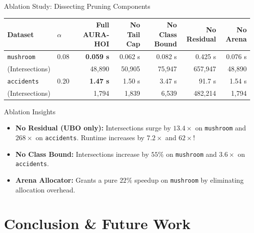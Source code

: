 \documentclass[aspectratio=169,10pt]{beamer}
\newcommand{\AURA}{\textsc{AURA-HOI}}
\begin{document}
\begin{frame}{Ablation Study: Dissecting Pruning Components}
  \begin{table}
    \small
    \begin{tabular}{llrrrrr}
      \toprule
      Dataset & $\alpha$ & Full \AURA{} & No Tail Cap & No Class Bound & No Residual & No Arena \\
      \midrule
      \texttt{mushroom} & 0.08 & \textbf{0.059 s} & 0.062 s & 0.082 s & 0.425 s & 0.076 s \\
      (Intersections) & & 48,890 & 50,905 & 75,947 & 657,947 & 48,890 \\
      \midrule
      \texttt{accidents} & 0.20 & \textbf{1.47 s} & 1.50 s & 3.47 s & 91.7 s & 1.54 s \\
      (Intersections) & & 1,794 & 1,839 & 6,539 & 482,214 & 1,794 \\
      \bottomrule
    \end{tabular}
  \end{table}

  \begin{block}{Ablation Insights}
    \begin{itemize}
      \item \textbf{No Residual (UBO only):} Intersections surge by \textbf{$13.4\times$} on \texttt{mushroom} and \textbf{$268\times$} on \texttt{accidents}. Runtime increases by $7.2\times$ and $62\times$!
      \item \textbf{No Class Bound:} Intersections increase by $55\%$ on \texttt{mushroom} and $3.6\times$ on \texttt{accidents}.
      \item \textbf{Arena Allocator:} Grants a pure $22\%$ speedup on \texttt{mushroom} by eliminating allocation overhead.
    \end{itemize}
  \end{block}
\end{frame}

\section{Conclusion \& Future Work}
\end{document}

